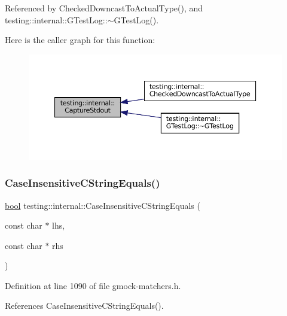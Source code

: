 Referenced by Checked\+Downcast\+To\+Actual\+Type(), and testing\+::internal\+::\+G\+Test\+Log\+::$\sim$\+G\+Test\+Log().

Here is the caller graph for this function\+:
\nopagebreak
\begin{figure}[H]
\begin{center}
\leavevmode
\includegraphics[width=350pt]{namespacetesting_1_1internal_acba06d4f0343dec407738ba5544af990_icgraph}
\end{center}
\end{figure}
\mbox{\label{namespacetesting_1_1internal_aebfd0cd34de52d7973a5b2d03ba848cf}} 
\subsubsection{\texorpdfstring{Case\+Insensitive\+C\+String\+Equals()}{CaseInsensitiveCStringEquals()}\hspace{0.1cm}{\footnotesize\ttfamily [1/2]}}
{\footnotesize\ttfamily \hyperlink{classbool}{bool} testing\+::internal\+::\+Case\+Insensitive\+C\+String\+Equals (\begin{DoxyParamCaption}\item[{const char $\ast$}]{lhs,  }\item[{const char $\ast$}]{rhs }\end{DoxyParamCaption})\hspace{0.3cm}{\ttfamily [inline]}}



Definition at line 1090 of file gmock-\/matchers.\+h.



References Case\+Insensitive\+C\+String\+Equals().



